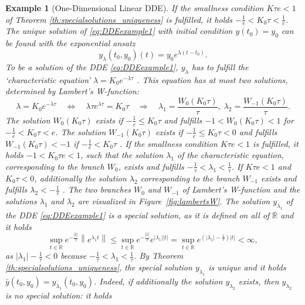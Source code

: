 \documentclass[10pt]{article}
\numberwithin{equation}{section}
\newtheorem{example}[theorem]{Example}
\newcommand\norm[1]{\left\lVert#1\right\rVert}
\newcommand\abs[1]{\left\lvert#1\right\rvert}
\begin{document}
\begin{example}[One-Dimensional Linear DDE]
		
		If the smallness condition $K\tau e<1$ of Theorem \ref{th:specialsolutions_uniqueness} is fulfilled, it holds $-\frac{1}{e} < K_0 \tau<\frac{1}{e} $. The unique solution of \eqref{eq:DDEexample1} with initial condition $y(t_0) = y_0$ can be found with the exponential ansatz
		\begin{equation*}
			y_\lambda(t_0,y_0)(t) = y_0 e^{\lambda (t-t_0)}.
		\end{equation*}
		To be a solution of the DDE \eqref{eq:DDEexample1}, $y_\lambda$ has to fulfill the `characteristic equation' $\lambda = K_0e^{-\lambda \tau}$ \cite{Driver1976}. 
		This equation has at most two solutions, determined by Lambert's W-function:
		\begin{equation} \label{eq:characteristic}
			\lambda = K_0e^{-\lambda \tau} \quad \Leftrightarrow \quad \lambda \tau e^{\lambda \tau} = K_0 \tau \quad \Rightarrow \quad \lambda_1 = \frac{W_0(K_0\tau)}{\tau}, \; \lambda_2 = \frac{W_{-1}(K_0\tau)}{\tau}.
		\end{equation}
		The solution $W_0(K_0\tau)$ exists if $-\frac{1}{e} \leq K_0 \tau $ and fulfills $-1<W_0(K_0\tau)<1$ for $-\frac{1}{e} <K_0\tau<e$. The solution $W_{-1}(K_0\tau)$ exists if $-\frac{1}{e} \leq K_0\tau < 0$ and fulfills $W_{-1}(K_0\tau) < -1$ if $-\frac{1}{e}<K_0 \tau$ \cite{Corless1996}. If the smallness condition $K\tau e<1$ is fulfilled, it holds $-1<K_0\tau e< 1$, such that the solution $\lambda_1$ of the characteristic equation, corresponding to the branch $W_0$,  exists and fulfills $-\frac{1}{\tau}<\lambda_1<\frac{1}{\tau}$. If $K\tau e<1$ and  $K_0 \tau < 0$,  additionally the solution $\lambda_2$ corresponding to the branch $W_{-1}$ exists and fulfills $\lambda_2 < -\frac{1}{\tau}$ \cite{Driver1968}. The two branches $W_0$ and $W_{-1}$ of Lambert's W-function and the solutions $\lambda_1$ and $\lambda_2$ are  visualized in Figure~\ref{fig:lambertsW}. The solution $y_{\lambda_1}$ of the DDE \eqref{eq:DDEexample1} is a special solution, as it is defined on all of $\mathbb{R}$ and it holds
		\begin{equation*}
			\sup_{t \in \mathbb{R}} e^{-\frac{\abs{t}}{\tau} }  \norm{e^{\lambda_1t}} \leq \sup_{t \in \mathbb{R}} e^{-\frac{\abs{t}}{\tau} }  e^{\abs{\lambda_1} \abs{t}}= \sup_{t \in \mathbb{R}}  e^{\left(\abs{\lambda_1}-\frac{1}{\tau}\right) \abs{t}} < \infty,
		\end{equation*}
		as $\abs{\lambda_1}-\frac{1}{\tau}<0$ because $-\frac{1}{\tau} < \lambda_1  < \frac{1}{\tau}$. By Theorem \ref{th:specialsolutions_uniqueness}, the special solution $y_{\lambda_1}$ is unique and it holds $\bar{y}(t_0,y_0) = y_{\lambda_1}(t_0,y_0)$. Indeed, if additionally the solution $y_{\lambda_2}$ exists, then $y_{\lambda_2}$ is no special solution: it holds

\end{example}
\end{document}
